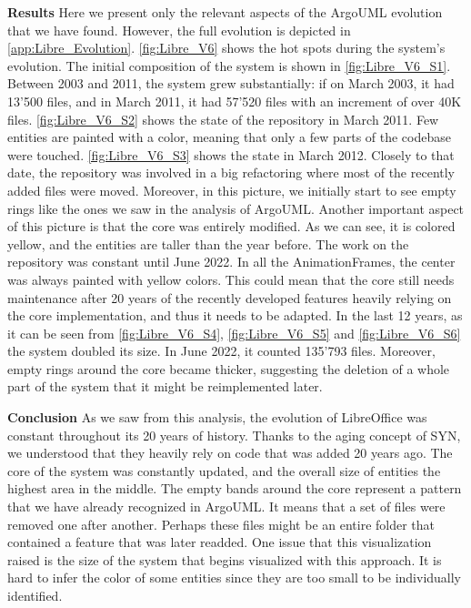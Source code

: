 \textbf{Results}
Here we present only the relevant aspects of the ArgoUML evolution that we have found. However, the full evolution is depicted in \autoref{app:Libre_Evolution}. \autoref{fig:Libre_V6} shows the hot spots during the system's evolution. The initial composition of the system is shown in \autoref{fig:Libre_V6_S1}. Between 2003 and 2011, the system 
grew substantially: if on March 2003, it had 13'500 files, and in March 2011, it had 57'520 files with an increment of over 40K files. \autoref{fig:Libre_V6_S2} shows the state of the repository in March 2011. Few entities are painted with a color, meaning that only a few parts of the codebase were touched. \autoref{fig:Libre_V6_S3} shows the state in March 2012. Closely to that date, the repository was involved in a big refactoring where most of the recently added files were moved. Moreover, in this picture, we initially start to see empty rings like the ones we saw in the analysis of ArgoUML. Another important aspect of this picture is that the core was entirely modified. As we can see, it is colored yellow, and the entities are taller than the year before. The work on the repository was constant until June 2022. In all the AnimationFrames, the center was always painted with yellow colors. This could mean that the core still needs maintenance after 20 years of the recently developed features heavily relying on the core implementation, and thus it needs to be adapted. In the last 12 years, as it can be seen from \ref{fig:Libre_V6_S4}, \ref{fig:Libre_V6_S5} and \ref{fig:Libre_V6_S6} the system doubled its size. In June 2022, it counted 135'793 files. Moreover, empty rings around the core became thicker, suggesting the deletion of a whole part of the system that it might be reimplemented later.


\textbf{Conclusion} As we saw from this analysis, the evolution of LibreOffice was constant throughout its 20 years of history. 
Thanks to the aging concept of SYN, we understood that they heavily rely on code that was added 20 years ago. The core of the system was constantly updated, and the overall size of entities the highest area in the middle. The empty bands around the core represent a pattern that we have already recognized in ArgoUML. It means that a set of files were removed one after another. Perhaps these files might be an entire folder that contained a feature that was later readded. One issue that this visualization raised is the size of the system that begins visualized with this approach. It is hard to infer the color of some entities since they are too small to be individually identified. 

